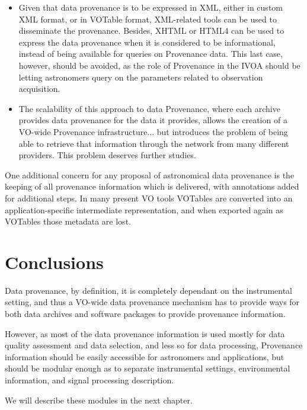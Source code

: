 \begin{itemize}
			\item Given that data provenance is to be expressed
			in XML, either in custom XML format, or in VOTable
			format, XML-related tools can be used to disseminate
			the provenance. Besides, XHTML or HTML4 can be used
			to express the data provenance when it is considered
			to be informational, instead of being available for
			queries on Provenance data. This last case, however,
			should be avoided, as the role of Provenance in the
			IVOA should be letting astronomers query on the
			parameters related to observation acquisition.
			
			\item The scalability of this approach to data
			Provenance, where each archive provides data provenance
			for the data it provides, allows the creation of a
			VO-wide Provenance infrastructure... but introduces the
			problem of being able to retrieve that information
			through the network from many different providers. This
			problem deserves further studies.
		\end{itemize}
		
		One additional concern for any proposal of astronomical
		data provenance is the keeping of all provenance
		information which is delivered, with annotations added for
		additional steps. In many present VO tools VOTables are
		converted into an application-specific intermediate
		representation, and when exported again as VOTables those
		metadata are lost.
		
	
	
	
	\section{Conclusions} %
	\label{sec:conclusions_vodataprovenance}
		
		Data provenance, by definition, it is completely dependant
		on the instrumental setting, and thus a VO-wide data
		provenance mechanism has to provide ways for both data
		archives and software packages to provide provenance
		information.
		
		However, as most of the data provenance information is
		used mostly for data quality assessment and data selection,
		and less so for data processing, Provenance information
		should be easily accessible for astronomers and
		applications, but should be modular enough as to separate
		instrumental settings, environmental information,
		and signal processing description.
		
		We will describe these modules in the next chapter.
		
	
